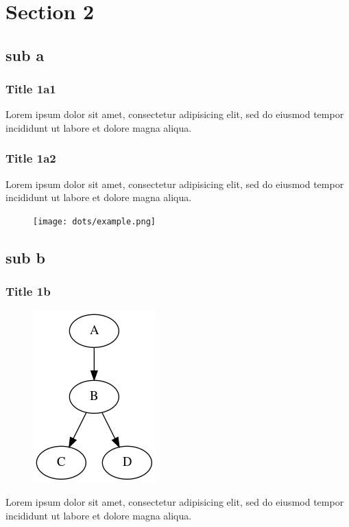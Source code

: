 \documentclass[beamer]{standalone}
\begin{document}
\section{Section 2}
\subsection{sub a}
\begin{frame}
\frametitle{Title 1a1}
Lorem ipsum dolor sit amet, consectetur adipisicing elit, sed do eiusmod tempor incididunt ut labore et dolore magna aliqua.
\end{frame}
\begin{frame}
\frametitle{Title 1a2}
Lorem ipsum dolor sit amet, consectetur adipisicing elit, sed do eiusmod tempor incididunt ut labore et dolore magna aliqua.
\begin{figure}
\centerline{\texttt{[image: dots/example.png]}}
\end{figure}
\end{frame}
\subsection{sub b}
\begin{frame}
\frametitle{Title 1b}
\begin{figure}
\centerline{\includegraphics[scale=.5]{imgs/foo.png}}
\end{figure}
Lorem ipsum dolor sit amet, consectetur adipisicing elit, sed do eiusmod tempor incididunt ut labore et dolore magna aliqua.
\end{frame}
\end{document}
